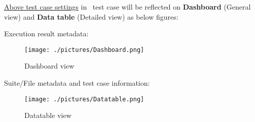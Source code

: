 \hyperref[description-robotframework-testcase-settings]{Above test case settings}
in \rfwcore\ test case will be reflected on \textbf{Dashboard} (General view)
and \textbf{Data table} (Detailed view) as below figures:

Execution result metadata:

\begin{figure}[h!]
  \texttt{[image: ./pictures/Dashboard.png]}
  \caption{Dashboard view}
\end{figure}

Suite/File metadata and test case information:

\begin{figure}[h!]
  \texttt{[image: ./pictures/Datatable.png]}
  \caption{Datatable view}
\end{figure}
